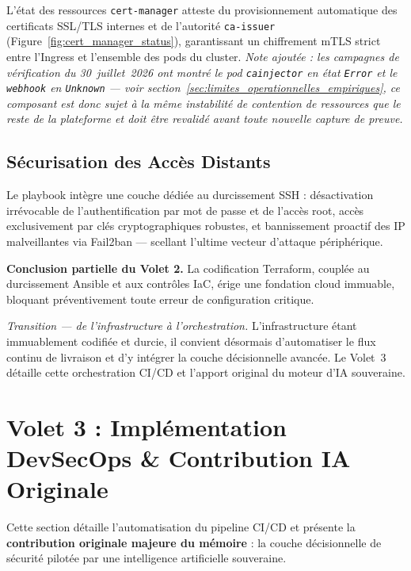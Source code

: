 L'état des ressources \texttt{cert-manager} atteste du provisionnement automatique des certificats SSL/TLS internes et de l'autorité \texttt{ca-issuer} (Figure~\ref{fig:cert_manager_status}), garantissant un chiffrement mTLS strict entre l'Ingress et l'ensemble des pods du cluster. \textit{Note ajoutée : les campagnes de vérification du 30~juillet~2026 ont montré le pod \texttt{cainjector} en état \texttt{Error} et le \texttt{webhook} en \texttt{Unknown} — voir section~\ref{sec:limites_operationnelles_empiriques}, ce composant est donc sujet à la même instabilité de contention de ressources que le reste de la plateforme et doit être revalidé avant toute nouvelle capture de preuve.}

\subsection{Sécurisation des Accès Distants}

Le playbook intègre une couche dédiée au durcissement SSH : désactivation irrévocable de l'authentification par mot de passe et de l'accès root, accès exclusivement par clés cryptographiques robustes, et bannissement proactif des IP malveillantes via Fail2ban — scellant l'ultime vecteur d'attaque périphérique.

\bigskip
\noindent\textbf{Conclusion partielle du Volet 2.} La codification Terraform, couplée au durcissement Ansible et aux contrôles IaC, érige une fondation cloud immuable, bloquant préventivement toute erreur de configuration critique.

\medskip
\noindent\textit{Transition — de l'infrastructure à l'orchestration.} L'infrastructure étant immuablement codifiée et durcie, il convient désormais d'automatiser le flux continu de livraison et d'y intégrer la couche décisionnelle avancée. Le Volet~3 détaille cette orchestration CI/CD et l'apport original du moteur d'IA souveraine.


\section{Volet 3 : Implémentation DevSecOps \& Contribution IA Originale}
\label{sec:volet_impl}

Cette section détaille l'automatisation du pipeline CI/CD et présente la \textbf{contribution originale majeure du mémoire} : la couche décisionnelle de sécurité pilotée par une intelligence artificielle souveraine.

